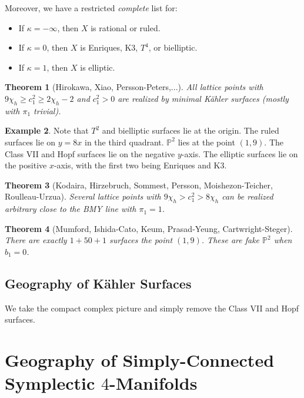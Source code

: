 \documentclass[leqno, openany]{memoir}
\newtheorem{thm}{Theorem}[chapter]
\theoremstyle{definition}
\newtheorem{exm}[thm]{Example}
\theoremstyle{remark}
\theoremstyle{plain}
\theoremstyle{definition}
\theoremstyle{remark}
\renewcommand{\P}{\mathbb{P}}
\begin{document}
Moreover, we have a restricted \textit{complete} list for:
\begin{itemize}
    \item If $\kappa = -\infty$, then $X$ is rational or ruled.
    \item If $\kappa = 0$, then $X$ is Enriques, K3, $T^4$, or bielliptic.
    \item If $\kappa = 1$, then $X$ is elliptic.
\end{itemize}

\begin{thm}[Hirokawa, Xiao, Persson-Peters,...]
    All lattice points with $9 \chi_h \geq c_1^2 \geq 2 \chi_h - 2$ and $c_1^2 > 0$ are realized by minimal K\"ahler surfaces (mostly with $\pi_1$ trivial).
\end{thm}

\begin{exm}
    Note that $T^2$ and bielliptic surfaces lie at the origin. The ruled surfaces lie on $y = 8x$ in the third quadrant. $\P^2$ lies at the point $(1,9)$. The Class VII and Hopf surfaces lie on the negative $y$-axis. The elliptic surfaces lie on the positive $x$-axis, with the first two being Enriques and K3.
\end{exm}

\begin{thm}[Kodaira, Hirzebruch, Sommest, Persson, Moishezon-Teicher, Roulleau-Urzua]
    Several lattice points with $9 \chi_h > c_1^2 > 8 \chi_h$ can be realized arbitrary close to the BMY line with $\pi_1 = 1$.
\end{thm}

\begin{thm}[Mumford, Ishida-Cato, Keum, Prasad-Yeung, Cartwright-Steger]
    There are exactly $1 + 50 + 1$ surfaces the point $(1,9)$. These are fake $\P^2$ when $b_1 = 0$.
\end{thm}

\subsection{Geography of K\"ahler Surfaces}%
\label{sub:geography_of_k"ahler_surfaces}

We take the compact complex picture and simply remove the Class VII and Hopf surfaces.

\section{Geography of Simply-Connected Symplectic $4$-Manifolds}%
\label{sec:geography_of_simply_connected_symplectic_4_manifolds}
\end{document}
